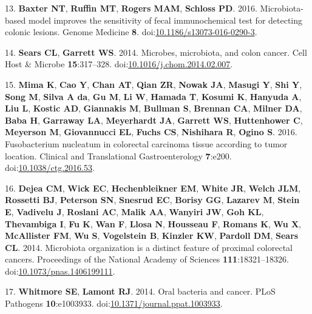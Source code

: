 \documentclass[11pt,]{article}
\begin{document}
\hypertarget{ref-Baxter2016}{}
13. \textbf{Baxter NT}, \textbf{Ruffin MT}, \textbf{Rogers MAM},
\textbf{Schloss PD}. 2016. Microbiota-based model improves the
sensitivity of fecal immunochemical test for detecting colonic lesions.
Genome Medicine \textbf{8}.
doi:\href{https://doi.org/10.1186/s13073-016-0290-3}{10.1186/s13073-016-0290-3}.

\hypertarget{ref-Sears2014}{}
14. \textbf{Sears CL}, \textbf{Garrett WS}. 2014. Microbes, microbiota,
and colon cancer. Cell Host \& Microbe \textbf{15}:317--328.
doi:\href{https://doi.org/10.1016/j.chom.2014.02.007}{10.1016/j.chom.2014.02.007}.

\hypertarget{ref-Mima2016}{}
15. \textbf{Mima K}, \textbf{Cao Y}, \textbf{Chan AT}, \textbf{Qian ZR},
\textbf{Nowak JA}, \textbf{Masugi Y}, \textbf{Shi Y}, \textbf{Song M},
\textbf{Silva A da}, \textbf{Gu M}, \textbf{Li W}, \textbf{Hamada T},
\textbf{Kosumi K}, \textbf{Hanyuda A}, \textbf{Liu L}, \textbf{Kostic
AD}, \textbf{Giannakis M}, \textbf{Bullman S}, \textbf{Brennan CA},
\textbf{Milner DA}, \textbf{Baba H}, \textbf{Garraway LA},
\textbf{Meyerhardt JA}, \textbf{Garrett WS}, \textbf{Huttenhower C},
\textbf{Meyerson M}, \textbf{Giovannucci EL}, \textbf{Fuchs CS},
\textbf{Nishihara R}, \textbf{Ogino S}. 2016. Fusobacterium nucleatum in
colorectal carcinoma tissue according to tumor location. Clinical and
Translational Gastroenterology \textbf{7}:e200.
doi:\href{https://doi.org/10.1038/ctg.2016.53}{10.1038/ctg.2016.53}.

\hypertarget{ref-Dejea2014}{}
16. \textbf{Dejea CM}, \textbf{Wick EC}, \textbf{Hechenbleikner EM},
\textbf{White JR}, \textbf{Welch JLM}, \textbf{Rossetti BJ},
\textbf{Peterson SN}, \textbf{Snesrud EC}, \textbf{Borisy GG},
\textbf{Lazarev M}, \textbf{Stein E}, \textbf{Vadivelu J},
\textbf{Roslani AC}, \textbf{Malik AA}, \textbf{Wanyiri JW}, \textbf{Goh
KL}, \textbf{Thevambiga I}, \textbf{Fu K}, \textbf{Wan F}, \textbf{Llosa
N}, \textbf{Housseau F}, \textbf{Romans K}, \textbf{Wu X},
\textbf{McAllister FM}, \textbf{Wu S}, \textbf{Vogelstein B},
\textbf{Kinzler KW}, \textbf{Pardoll DM}, \textbf{Sears CL}. 2014.
Microbiota organization is a distinct feature of proximal colorectal
cancers. Proceedings of the National Academy of Sciences
\textbf{111}:18321--18326.
doi:\href{https://doi.org/10.1073/pnas.1406199111}{10.1073/pnas.1406199111}.

\hypertarget{ref-Whitmore2014}{}
17. \textbf{Whitmore SE}, \textbf{Lamont RJ}. 2014. Oral bacteria and
cancer. PLoS Pathogens \textbf{10}:e1003933.
doi:\href{https://doi.org/10.1371/journal.ppat.1003933}{10.1371/journal.ppat.1003933}.
\end{document}
